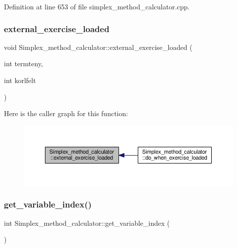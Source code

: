 Definition at line 653 of file simplex\+\_\+method\+\_\+calculator.\+cpp.

\mbox{\label{classSimplex__method__calculator_a47a8a303560fb07d57db24412971c72b}} 
\subsubsection{\texorpdfstring{external\+\_\+exercise\+\_\+loaded}{external\_exercise\_loaded}}
{\footnotesize\ttfamily void Simplex\+\_\+method\+\_\+calculator\+::external\+\_\+exercise\+\_\+loaded (\begin{DoxyParamCaption}\item[{int}]{termteny,  }\item[{int}]{korlfelt }\end{DoxyParamCaption})\hspace{0.3cm}{\ttfamily [signal]}}

Here is the caller graph for this function\+:\nopagebreak
\begin{figure}[H]
\begin{center}
\leavevmode
\includegraphics[width=350pt]{classSimplex__method__calculator_a47a8a303560fb07d57db24412971c72b_icgraph}
\end{center}
\end{figure}
\mbox{\label{classSimplex__method__calculator_a551cf0e83837a64c4757d8c090d6926f}} 
\subsubsection{\texorpdfstring{get\+\_\+variable\+\_\+index()}{get\_variable\_index()}}
{\footnotesize\ttfamily int Simplex\+\_\+method\+\_\+calculator\+::get\+\_\+variable\+\_\+index (\begin{DoxyParamCaption}{ }\end{DoxyParamCaption})\hspace{0.3cm}{\ttfamily [private]}}



